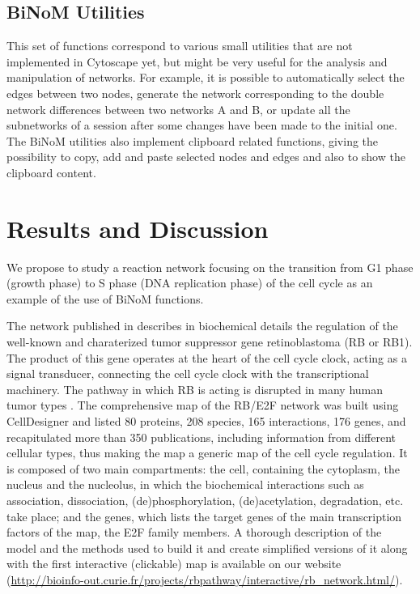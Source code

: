 \documentclass[10pt]{bmc_article}
\newenvironment{bmcformat}{\baselineskip20pt\sloppy\setboolean{publ}{false}}{\baselineskip20pt\sloppy}
\begin{document}
\begin{bmcformat}
\subsection*{BiNoM Utilities}
This set of functions correspond to various small utilities that are not
implemented in Cytoscape yet, but might be very useful for the analysis and
manipulation of networks. For example, it is possible to automatically select
the edges between two nodes, generate the network corresponding to the double
network differences between two networks A and B, or update all the subnetworks of
a session after some changes have been made to the initial one. The BiNoM utilities also implement
clipboard related functions, giving the possibility to copy, add and paste
selected nodes and edges and also to show the clipboard content. 


\section*{Results and Discussion}
We propose to study a reaction network focusing on the transition from G1 phase
(growth phase) to S phase (DNA replication phase) of the cell cycle
\cite{calzone2008comprehensive} as an example of the use of BiNoM functions. 

The network published in \cite{calzone2008comprehensive} describes in
biochemical details the regulation of the well-known and charaterized tumor
suppressor gene retinoblastoma (RB or RB1). The product of this gene operates at
the heart of the cell cycle clock, acting as a signal transducer, connecting the
cell cycle clock with the transcriptional machinery. The pathway in which RB is
acting is disrupted in many human tumor types \cite{weinberg1995retinoblastoma}.
The comprehensive map of the RB/E2F network was built using CellDesigner
\cite{funahashi2003celldesigner} and listed 80 proteins, 208 species, 165
interactions, 176 genes, and recapitulated more than 350 publications, including
information from different cellular types, thus making the map a generic map of
the cell cycle regulation. It is composed of two main compartments: the cell,
containing the cytoplasm, the nucleus and the nucleolus, in which the
biochemical interactions such as association, dissociation, (de)phosphorylation,
(de)acetylation, degradation, etc. take place; and the genes, which lists the
target genes of the main transcription factors of the map, the E2F family
members.
A thorough description of the model and the methods used to build it and create
simplified versions of it along with the first interactive (clickable) map is
available on our website
(\url{http://bioinfo-out.curie.fr/projects/rbpathway/interactive/rb_network.html/}).


\end{bmcformat}
\end{document}
